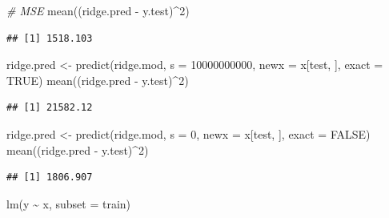 \documentclass[
  12pt,
]{book}
\newenvironment{Shaded}{\begin{snugshade}}{\end{snugshade}}
\newcommand{\AttributeTok}[1]{\textcolor[rgb]{0.77,0.63,0.00}{#1}}
\newcommand{\CommentTok}[1]{\textcolor[rgb]{0.56,0.35,0.01}{\textit{#1}}}
\newcommand{\ConstantTok}[1]{\textcolor[rgb]{0.00,0.00,0.00}{#1}}
\newcommand{\DecValTok}[1]{\textcolor[rgb]{0.00,0.00,0.81}{#1}}
\newcommand{\FunctionTok}[1]{\textcolor[rgb]{0.00,0.00,0.00}{#1}}
\newcommand{\NormalTok}[1]{#1}
\newcommand{\OtherTok}[1]{\textcolor[rgb]{0.56,0.35,0.01}{#1}}
\newcommand{\SpecialCharTok}[1]{\textcolor[rgb]{0.00,0.00,0.00}{#1}}
\theoremstyle{definition}
\theoremstyle{definition}
\theoremstyle{definition}
\theoremstyle{definition}
\theoremstyle{remark}
\begin{document}
\begin{Shaded}
\begin{Highlighting}[]
\CommentTok{\# MSE}
\FunctionTok{mean}\NormalTok{((ridge.pred }\SpecialCharTok{{-}}\NormalTok{ y.test)}\SpecialCharTok{\^{}}\DecValTok{2}\NormalTok{)}
\end{Highlighting}
\end{Shaded}

\begin{verbatim}
## [1] 1518.103
\end{verbatim}

\begin{Shaded}
\begin{Highlighting}[]
\NormalTok{ridge.pred }\OtherTok{\textless{}{-}} \FunctionTok{predict}\NormalTok{(ridge.mod, }\AttributeTok{s =} \DecValTok{10000000000}\NormalTok{, }\AttributeTok{newx =}\NormalTok{ x[test,}
\NormalTok{    ], }\AttributeTok{exact =} \ConstantTok{TRUE}\NormalTok{)}
\FunctionTok{mean}\NormalTok{((ridge.pred }\SpecialCharTok{{-}}\NormalTok{ y.test)}\SpecialCharTok{\^{}}\DecValTok{2}\NormalTok{)}
\end{Highlighting}
\end{Shaded}

\begin{verbatim}
## [1] 21582.12
\end{verbatim}

\begin{Shaded}
\begin{Highlighting}[]
\NormalTok{ridge.pred }\OtherTok{\textless{}{-}} \FunctionTok{predict}\NormalTok{(ridge.mod, }\AttributeTok{s =} \DecValTok{0}\NormalTok{, }\AttributeTok{newx =}\NormalTok{ x[test,}
\NormalTok{    ], }\AttributeTok{exact =} \ConstantTok{FALSE}\NormalTok{)}
\FunctionTok{mean}\NormalTok{((ridge.pred }\SpecialCharTok{{-}}\NormalTok{ y.test)}\SpecialCharTok{\^{}}\DecValTok{2}\NormalTok{)}
\end{Highlighting}
\end{Shaded}

\begin{verbatim}
## [1] 1806.907
\end{verbatim}

\begin{Shaded}
\begin{Highlighting}[]
\FunctionTok{lm}\NormalTok{(y }\SpecialCharTok{\textasciitilde{}}\NormalTok{ x, }\AttributeTok{subset =}\NormalTok{ train)}
\end{Highlighting}
\end{Shaded}
\end{document}
